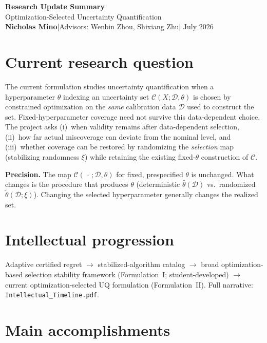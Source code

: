 \documentclass[11pt]{article}
\begin{document}
\begin{center}
{\LARGE\bfseries\color{navy} Research Update Summary}\\[2pt]
{\normalsize\color{slate} Optimization-Selected Uncertainty Quantification}\\[1pt]
{\small\textbf{Nicholas Mino}\quad\textcolor{accent}{|}\quad Advisors: Wenbin Zhou, Shixiang Zhu\quad\textcolor{accent}{|} July 2026}
\end{center}

\section{Current research question}

\begin{tcolorbox}[notebox]
The current formulation studies uncertainty quantification when a hyperparameter
$\theta$ indexing an uncertainty set $\mathcal{C}(X;\mathcal{D},\theta)$ is chosen by
constrained optimization on the \emph{same} calibration data $\mathcal{D}$ used to
construct the set.
Fixed-hyperparameter coverage need not survive this data-dependent choice.
The project asks (i)~when validity remains after data-dependent selection,
(ii)~how far actual miscoverage can deviate from the nominal level, and
(iii)~whether coverage can be restored by randomizing the
\emph{selection} map (stabilizing randomness $\xi$) while retaining the existing
fixed-$\theta$ construction of $\mathcal{C}$.
\end{tcolorbox}

\noindent\textbf{Precision.}
The map $\mathcal{C}(\,\cdot\,;\mathcal{D},\theta)$ for fixed, prespecified $\theta$ is unchanged.
What changes is the procedure that produces $\theta$ (deterministic
$\hat\theta(\mathcal{D})$ vs.\ randomized $\widetilde\theta(\mathcal{D};\xi)$).
Changing the selected hyperparameter generally changes the realized set.

\section{Intellectual progression}

Adaptive certified regret
$\to$ stabilized-algorithm catalog
$\to$ broad optimization-based selection stability framework (Formulation~I; student-developed)
$\to$ current optimization-selected UQ formulation (Formulation~II).
Full narrative: \texttt{Intellectual\_Timeline.pdf}.

\section{Main accomplishments}
\end{document}
